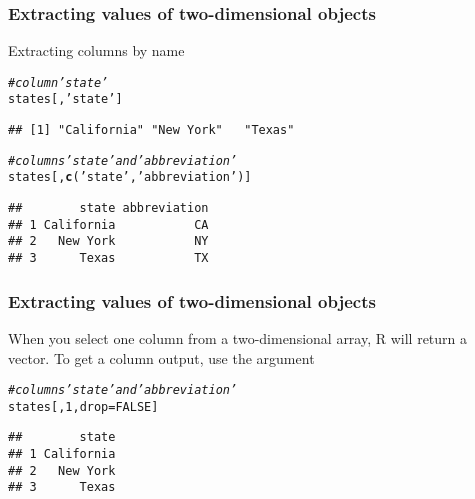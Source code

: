 \documentclass[12pt]{beamer}\usepackage[]{graphicx}\usepackage[]{color}
\makeatletter
\newcommand{\hlnum}[1]{\textcolor[rgb]{0.686,0.059,0.569}{#1}}%
\newcommand{\hlstr}[1]{\textcolor[rgb]{0.192,0.494,0.8}{#1}}%
\newcommand{\hlcom}[1]{\textcolor[rgb]{0.678,0.584,0.686}{\textit{#1}}}%
\newcommand{\hlstd}[1]{\textcolor[rgb]{0.345,0.345,0.345}{#1}}%
\newcommand{\hlkwc}[1]{\textcolor[rgb]{0.333,0.667,0.333}{#1}}%
\newcommand{\hlkwd}[1]{\textcolor[rgb]{0.737,0.353,0.396}{\textbf{#1}}}%
\newenvironment{kframe}{%
 \def\at@end@of@kframe{}%
 \ifinner\ifhmode%
  \def\at@end@of@kframe{\end{minipage}}%
  \begin{minipage}{\columnwidth}%
 \fi\fi%
 \def\FrameCommand##1{\hskip\@totalleftmargin \hskip-\fboxsep
 \colorbox{shadecolor}{##1}\hskip-\fboxsep
     \hskip-\linewidth \hskip-\@totalleftmargin \hskip\columnwidth}%
 \MakeFramed {\advance\hsize-\width
   \@totalleftmargin\z@ \linewidth\hsize
   \@setminipage}}%
 {\par\unskip\endMakeFramed%
 \at@end@of@kframe}
\newenvironment{knitrout}{}{} %
\makeatother
\begin{document}

\begin{frame}[fragile]
\frametitle{Extracting values of two-dimensional objects}

Extracting columns by name
\begin{knitrout}\footnotesize
{}\color{fgcolor}\begin{kframe}
\begin{alltt}
\hlcom{# column 'state'}
\hlstd{states[ ,} \hlstr{'state'}\hlstd{]}
\end{alltt}
\begin{verbatim}
## [1] "California" "New York"   "Texas"
\end{verbatim}
\begin{alltt}
\hlcom{# columns 'state' and 'abbreviation'}
\hlstd{states[ ,} \hlkwd{c}\hlstd{(}\hlstr{'state'}\hlstd{,} \hlstr{'abbreviation'}\hlstd{)]}
\end{alltt}
\begin{verbatim}
##        state abbreviation
## 1 California           CA
## 2   New York           NY
## 3      Texas           TX
\end{verbatim}
\end{kframe}
\end{knitrout}

\end{frame}


\begin{frame}[fragile]
\frametitle{Extracting values of two-dimensional objects}

When you select one column from a two-dimensional array, R will return a vector. To get a column output, use the argument 
\begin{knitrout}\footnotesize
{}\color{fgcolor}\begin{kframe}
\begin{alltt}
\hlcom{# columns 'state' and 'abbreviation'}
\hlstd{states[ ,} \hlnum{1}\hlstd{,} \hlkwc{drop} \hlstd{=} \hlnum{FALSE}\hlstd{]}
\end{alltt}
\begin{verbatim}
##        state
## 1 California
## 2   New York
## 3      Texas
\end{verbatim}
\end{kframe}
\end{knitrout}

\end{frame}
\end{document}
